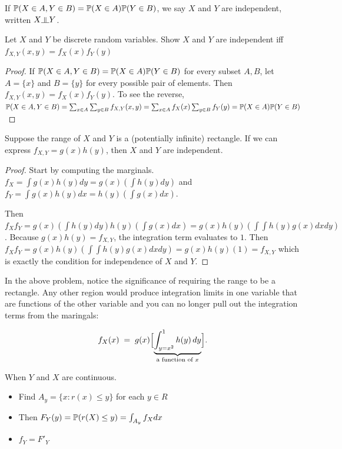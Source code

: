\documentclass[10pt]{article}
\begin{document}
\begin{definition}
    If $\P(X \in A, Y \in B) = \P(X \in A)\P(Y \in B)$, we say $X$ and $Y$ are
    independent, written $X \indep Y$.
\end{definition}

\setcounter{exercise}{4}
\begin{exercise}
    Let $X$ and $Y$ be discrete random variables. Show $X$ and $Y$ are independent iff $f_{X,Y}(x, y) = f_X(x)f_Y(y)$
\end{exercise}

\begin{proof}
    If $\P(X \in A, Y \in B) = \P(X \in A)\P(Y \in B)$ for every subset $A, B$, let $A = \{x\}$ and $B = \{y\}$ for every possible pair of elements. Then $f_{X, Y}(x, y) =
    f_X(x)f_Y(y)$. To see the reverse, 
    $\P(X \in A, Y \in B) = \sum_{x\in A}\sum_{y\in B}f_{X,Y}(x, y) =
    \sum_{x\in A} f_X(x) \sum_{y\in B} f_Y(y) = \P(X \in A)\P(Y \in B)$
\end{proof}

\begin{theorem}
    Suppose the range of $X$ and $Y$ is a (potentially infinite) rectangle. If we can express $f_{X,Y} =
    g(x)h(y)$, then $X$ and $Y$ are independent.
\end{theorem}

\begin{proof}
    Start by computing the marginals. $f_X = \int g(x)h(y) dy = g(x) (\int h(y)
    dy)$ and $f_Y = \int g(x)h(y) dx = h(y)(\int g(x) dx)$. 

    Then $f_X f_Y = g(x) (\int h(y) dy) h(y) (\int g(x) dx) = g(x)h(y) (\int \int h(y) g(x) dx
    dy)$. Because $g(x)h(y) = f_{X,Y}$, the integration term evaluates to $1$.
    Then $f_Xf_Y=g(x)h(y)(\int \int h(y) g(x) dx dy)=g(x)h(y)(1)=f_{X,Y}$ which is exactly the condition for
    independence of $X$ and $Y$.
\end{proof}

In the above problem, notice the significance of requiring the range to be a
rectangle. Any other region would produce integration limits in one variable
that are functions of the other variable and you can no longer pull out the
integration terms from the maringals:

\[
f_X(x) \;=\; g(x)\Bigl[\underbrace{\int_{y = x^2}^{1} h(y)\,dy}_{\text{a function of }x}\Bigr].
\]

\begin{definition}
    When $Y$ and $X$ are continuous.
    \begin{itemize}
        \item{Find $A_y = \{ x : r(x) \leq y \}$ for each $y \in R$ }
        \item{Then $F_Y(y) = \P(r(X) \leq y) = \int_{A_y} f_X dx$}
        \item{$f_Y = F'_Y$}
    \end{itemize}
\end{definition}
\end{document}
